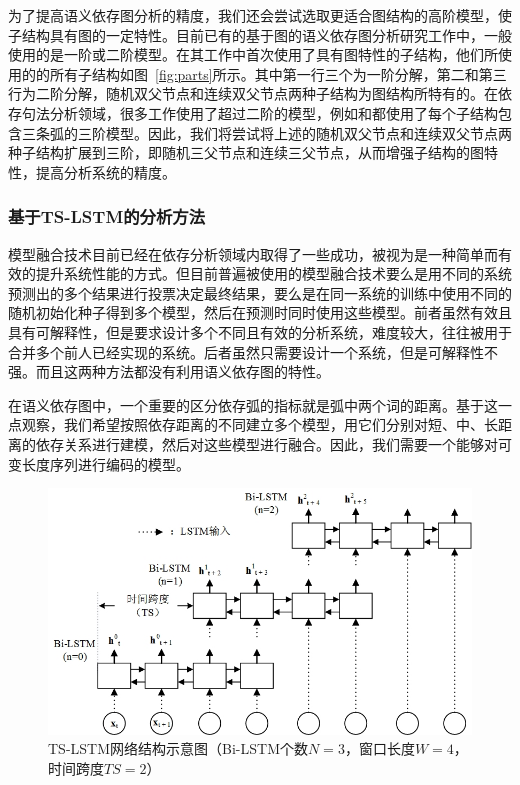 为了提高语义依存图分析的精度，我们还会尝试选取更适合图结构的高阶模型，使子结构具有图的一定特性。目前已有的基于图的语义依存图分析研究工作中，一般使用的是一阶或二阶模型。在其工作中首次使用了具有图特性的子结构，他们所使用的的所有子结构如图~\ref{fig:parts}所示。其中第一行三个为一阶分解，第二和第三行为二阶分解，随机双父节点和连续双父节点两种子结构为图结构所特有的。在依存句法分析领域，很多工作使用了超过二阶的模型，例如和都使用了每个子结构包含三条弧的三阶模型。因此，我们将尝试将上述的随机双父节点和连续双父节点两种子结构扩展到三阶，即随机三父节点和连续三父节点，从而增强子结构的图特性，提高分析系统的精度。

\subsubsection{基于TS-LSTM的分析方法}

模型融合技术目前已经在依存分析领域内取得了一些成功，被视为是一种简单而有效的提升系统性能的方式。但目前普遍被使用的模型融合技术要么是用不同的系统预测出的多个结果进行投票决定最终结果，要么是在同一系统的训练中使用不同的随机初始化种子得到多个模型，然后在预测时同时使用这些模型。前者虽然有效且具有可解释性，但是要求设计多个不同且有效的分析系统，难度较大，往往被用于合并多个前人已经实现的系统。后者虽然只需要设计一个系统，但是可解释性不强。而且这两种方法都没有利用语义依存图的特性。

在语义依存图中，一个重要的区分依存弧的指标就是弧中两个词的距离。基于这一点观察，我们希望按照依存距离的不同建立多个模型，用它们分别对短、中、长距离的依存关系进行建模，然后对这些模型进行融合。因此，我们需要一个能够对可变长度序列进行编码的模型。

\begin{figure}[hbtp]
	\centering
	\includegraphics[width=130mm]{picture/ts-lstm.jpg}
	\caption{TS-LSTM网络结构示意图（Bi-LSTM个数$N=3$，窗口长度$W=4$，时间跨度$TS=2$）}
	\label{fig:ts-lstm}
\end{figure}


